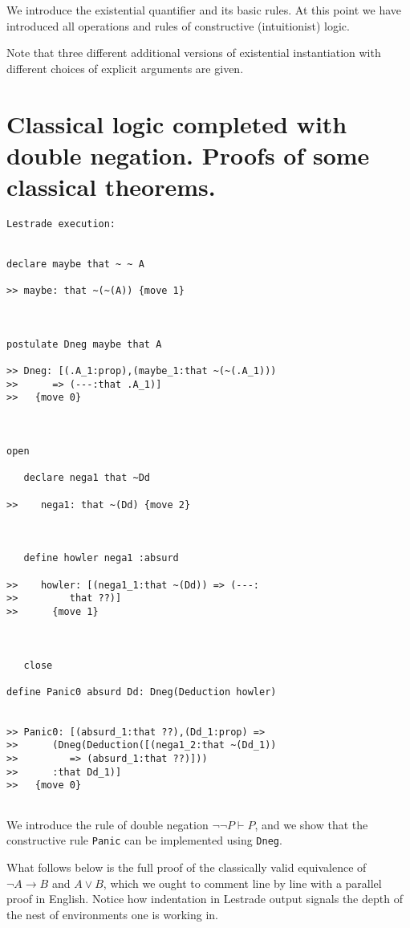 \documentclass[12pt]{article}
\begin{document}
We introduce the existential quantifier and its basic rules.  At this point we have introduced all operations and rules of constructive (intuitionist) logic.

Note that three different additional versions of existential instantiation with different choices of explicit arguments are given.

\section{Classical logic completed with double negation.  Proofs of some classical theorems.}

\begin{verbatim}Lestrade execution:


declare maybe that ~ ~ A

>> maybe: that ~(~(A)) {move 1}



postulate Dneg maybe that A

>> Dneg: [(.A_1:prop),(maybe_1:that ~(~(.A_1)))
>>      => (---:that .A_1)]
>>   {move 0}



open

   declare nega1 that ~Dd

>>    nega1: that ~(Dd) {move 2}



   define howler nega1 :absurd

>>    howler: [(nega1_1:that ~(Dd)) => (---:
>>         that ??)]
>>      {move 1}



   close

define Panic0 absurd Dd: Dneg(Deduction howler)


>> Panic0: [(absurd_1:that ??),(Dd_1:prop) =>
>>      (Dneg(Deduction([(nega1_2:that ~(Dd_1))
>>         => (absurd_1:that ??)]))
>>      :that Dd_1)]
>>   {move 0}


\end{verbatim}

We introduce the rule of double negation $\neg \neg P \vdash P$, and we show that the constructive rule {\tt Panic} can be implemented using
{\tt Dneg}.

What follows below is the full proof of the classically valid equivalence of $\neg A \rightarrow B$ and $A \vee B$, which we ought to comment
line by line with a parallel proof in English.  Notice how indentation in Lestrade output signals the depth of the nest of environments one is working in.
\end{document}
